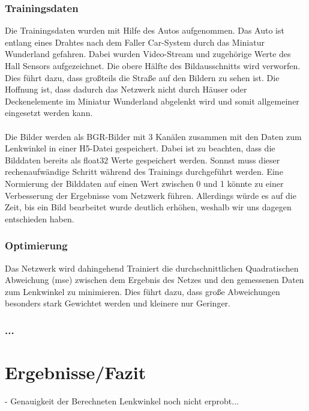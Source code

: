 \documentclass[a4paper, 12pt]{scrartcl}
\begin{document}
				\subsubsection{Trainingsdaten}
				Die Trainingsdaten wurden mit Hilfe des Autos aufgenommen. Das Auto ist entlang eines Drahtes nach dem Faller Car-System durch das Miniatur Wunderland gefahren. Dabei wurden Video-Stream und zugehörige Werte des Hall Sensors aufgezeichnet. Die obere Hälfte des Bildausschnitts wird verworfen. Dies führt dazu, dass großteils die Straße auf den Bildern zu sehen ist. Die Hoffnung ist, dass dadurch das Netzwerk nicht durch Häuser oder Deckenelemente im Miniatur Wunderland abgelenkt wird und somit allgemeiner eingesetzt werden kann. \\ \\
				Die Bilder werden als BGR-Bilder mit 3 Kanälen zusammen mit den Daten zum Lenkwinkel in einer H5-Datei gespeichert. Dabei ist zu beachten, dass die Bilddaten bereits als float32 Werte gespeichert werden. Sonnst muss dieser rechenaufwändige Schritt während des Trainings durchgeführt werden. Eine Normierung der Bilddaten auf einen Wert zwischen 0 und 1 könnte zu einer Verbesserung der Ergebnisse vom Netzwerk führen. Allerdings würde es auf die Zeit, bis ein Bild bearbeitet wurde deutlich erhöhen, weshalb wir uns dagegen entschieden haben.
				\subsubsection{Optimierung}
				Das Netzwerk wird dahingehend Trainiert die durchschnittlichen Quadratischen Abweichung (mse) zwischen dem Ergebnis des Netzes und den gemessenen Daten zum Lenkwinkel zu minimieren. Dies führt dazu, dass große Abweichungen besonders stark Gewichtet werden und kleinere nur Geringer. 
				\subsubsection{...}
			
	\section{Ergebnisse/Fazit}
	- Genauigkeit der Berechneten Lenkwinkel noch nicht erprobt...
\end{document}
